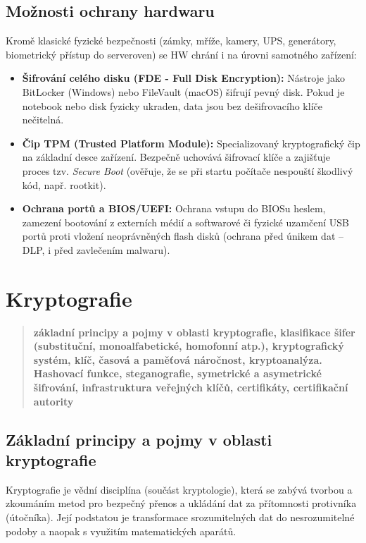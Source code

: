 \subsection{Možnosti ochrany hardwaru}
Kromě klasické fyzické bezpečnosti (zámky, mříže, kamery, UPS, generátory, biometrický přístup do serveroven) se HW chrání i na úrovni samotného zařízení:
\begin{itemize}
    \item \textbf{Šifrování celého disku (FDE - Full Disk Encryption):} Nástroje jako BitLocker (Windows) nebo FileVault (macOS) šifrují pevný disk. Pokud je notebook nebo disk fyzicky ukraden, data jsou bez dešifrovacího klíče nečitelná.
    \item \textbf{Čip TPM (Trusted Platform Module):} Specializovaný kryptografický čip na základní desce zařízení. Bezpečně uchovává šifrovací klíče a zajišťuje proces tzv. \textit{Secure Boot} (ověřuje, že se při startu počítače nespouští škodlivý kód, např. rootkit).
    \item \textbf{Ochrana portů a BIOS/UEFI:} Ochrana vstupu do BIOSu heslem, zamezení bootování z externích médií a softwarové či fyzické uzamčení USB portů proti vložení neoprávněných flash disků (ochrana před únikem dat – DLP, i před zavlečením malwaru).
\end{itemize}

\section{Kryptografie}
\begin{quote}
    \textbf{základní principy a pojmy v oblasti kryptografie, klasifikace šifer (substituční, monoalfabetické, homofonní atp.), kryptografický systém, klíč, časová a paměťová náročnost, kryptoanalýza. Hashovací funkce, steganografie, symetrické a asymetrické šifrování, infrastruktura veřejných klíčů, certifikáty, certifikační autority}
\end{quote}

\subsection{Základní principy a pojmy v oblasti kryptografie}

Kryptografie je vědní disciplína (součást kryptologie), která se zabývá tvorbou a zkoumáním metod pro bezpečný přenos a ukládání dat za přítomnosti protivníka (útočníka). Její podstatou je transformace srozumitelných dat do nesrozumitelné podoby a naopak s využitím matematických aparátů.

